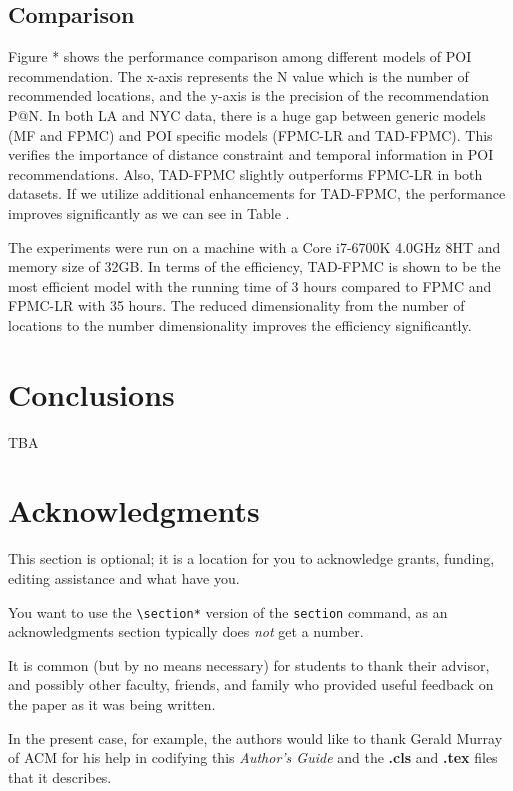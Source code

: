 \documentclass{sig-alternate}
\begin{document}
\subsection{Comparison}
\label{comparison}
Figure * shows the performance comparison among different models of POI recommendation. 
The x-axis represents the N value which is the number of recommended locations, and the y-axis 
is the precision of the recommendation P@N. In both LA and NYC data, there is a huge gap 
between generic models (MF and FPMC) and POI specific models (FPMC-LR and TAD-FPMC). 
This verifies the importance of distance constraint and temporal information in POI recommendations. 
Also, TAD-FPMC slightly outperforms FPMC-LR in both datasets. If we utilize additional enhancements 
for TAD-FPMC, the performance improves significantly as we can see in Table .

The experiments were run on a machine with a Core i7-6700K 4.0GHz 8HT and memory size of 32GB. 
In terms of the efficiency, TAD-FPMC is shown to be the most efficient model with the running time of 
3 hours compared to FPMC and FPMC-LR with 35 hours. The reduced dimensionality from the number of 
locations to the number dimensionality improves the efficiency significantly.

\section{Conclusions}
\label{sec:conclusions}

TBA

\section*{Acknowledgments}
\label{sec:acknowledgments}

This section is optional; it is a location for you
to acknowledge grants, funding, editing assistance and
what have you.

You want to use the \texttt{\textbackslash section*} version of the \texttt{section}
command, as an acknowledgments section typically does \emph{not} get
a number.

It is common (but by no means necessary) for students to thank
their advisor, and possibly other faculty, friends, and family who provided
useful feedback on the paper as it was being written.

In the present case, for example, the
authors would like to thank Gerald Murray of ACM for
his help in codifying this \textit{Author's Guide}
and the \textbf{.cls} and \textbf{.tex} files that it describes.


  
\end{document}
